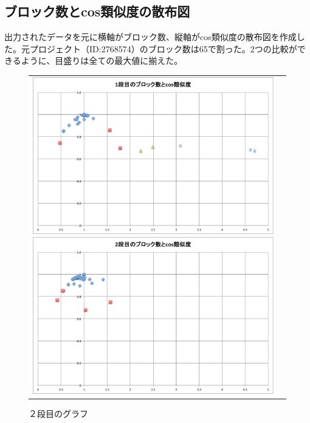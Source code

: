 \documentclass[a4paper,10pt,onecolumn,oneside,openany]{jsbook}
\begin{document}
 \newpage
\subsection{ブロック数とcos類似度の散布図}
 出力されたデータを元に横軸がブロック数、縦軸がcos類似度の散布図を作成した。元プロジェクト（ID:2768574）のブロック数は65で割った。2つの比較ができるように、目盛りは全ての最大値に揃えた。

\begin{figure}[h]
 \begin{tabular}{cc}
 	\begin{minipage}[t]{0.45\hsize}
	 \centering
	 \includegraphics[keepaspectratio, scale = 0.25]{mazegame_first_block.pdf}
	 \caption{１段目のグラフ}
	 \label{mazegame_first_block_cos}
	\end{minipage}
        \begin{minipage}[t]{0.45\hsize}
	 \centering
	 \includegraphics[keepaspectratio, scale = 0.25]{mazegame_second_block.pdf}
	 \caption{２段目のグラフ}
	 \label{mazegame_second_block_cos}
	\end{minipage}
 \end{tabular}
 \end{figure}
\end{document}
